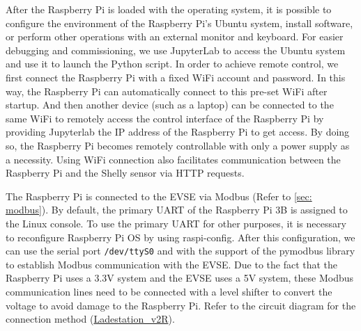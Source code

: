 \documentclass[
	english,
	ruledheaders=section,%
	class=report,%
	thesis={type=Report},%
	accentcolor=9c,%
	custommargins=true,%
	marginpar=false,%
	parskip=half-,%
	fontsize=11pt,%
	logofile={img/tuda_logo.pdf}, %
]{tudapub}
\begin{document}
After the Raspberry Pi is loaded with the operating system, it is possible to configure the environment of the Raspberry Pi's Ubuntu system, install software, or perform other operations with an external monitor and keyboard. For easier debugging and commissioning, we use JupyterLab to access the Ubuntu system and use it to launch the Python script. In order to achieve remote control, we first connect the Raspberry Pi with a fixed WiFi account and password. In this way, the Raspberry Pi can automatically connect to this pre-set WiFi after startup. And then another device (such as a laptop) can be connected to the same WiFi to remotely access the control interface of the Raspberry Pi by providing Jupyterlab the IP address of the Raspberry Pi to get access. By doing so, the Raspberry Pi becomes remotely controllable with only a power supply as a necessity. Using WiFi connection also facilitates communication between the Raspberry Pi and the Shelly sensor via HTTP requests.

The Raspberry Pi is connected to the EVSE via Modbus (Refer to \autoref{sec: modbus}). By default, the primary UART of the Raspberry Pi 3B is assigned to the Linux console. To use the primary UART for other purposes, it is necessary to reconfigure Raspberry Pi OS by using raspi-config. After this configuration, we can use the serial port \texttt{/dev/ttyS0} and with the support of the pymodbus library to establish Modbus communication with the EVSE. \cite{serialport}
Due to the fact that the Raspberry Pi uses a 3.3V system and the EVSE uses a 5V system, these Modbus communication lines need to be connected with a level shifter to convert the voltage to avoid damage to the Raspberry Pi. Refer to the circuit diagram for the connection method (\hyperref[add:Ladestation_v2R]{Ladestation\_v2R}).
\end{document}
